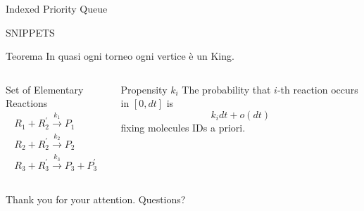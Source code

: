 \documentclass{beamer}
\begin{document}
\begin{frame}{Indexed Priority Queue}
  
\end{frame}

\begin{frame}{SNIPPETS}
  \begin{center}
    \begin{minipage}{.7 \textwidth}
      \begin{block}{Teorema}
        In quasi ogni torneo ogni vertice è un King.
      \end{block}
    \end{minipage}
  \end{center}
  \begin{columns}
    \begin{column}{.45 \textwidth}
      \begin{block}{Set of Elementary Reactions}
        \begin{equation*}
          \begin{gathered}
            R_1 + R^\prime_2 \xrightarrow{k_1} P_1 \\
            R_2 + R^\prime_2 \xrightarrow{k_2} P_2 \\
            R_3 + R_3^\prime \xrightarrow{k_3} P_3 + P_3^\prime 
          \end{gathered}
        \end{equation*}
      \end{block}
    \end{column} 
    \begin{column}{.45 \textwidth}
      \begin{block}{Propensity $k_i$}
        The probability that $i$-th reaction occurs
        in  $[0, dt]$ is
        $$k_i dt + o(dt)$$
        fixing molecules IDs a priori.
      \end{block}
    \end{column}
  \end{columns}
\end{frame}

\begin{frame}
  \begin{center}
    \Huge{Thank you for your attention.}
    \Huge{Questions?}
  \end{center}
\end{frame}
\end{document}
